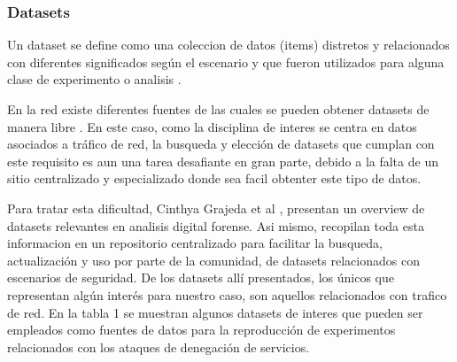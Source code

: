 \documentclass[12pt]{article}
\begin{document}

\subsubsection{Datasets} 

Un dataset se define como una coleccion de datos (items) distretos y
relacionados con diferentes significados según el escenario y que
fueron utilizados para alguna clase de experimento o analisis
\citep{datasets_availability}.

En la red existe diferentes fuentes de las cuales se pueden obtener
datasets de manera libre \citep{UCI, kaggle,
  awesome_public_datasets}. En este caso, como la disciplina de
interes se centra en datos asociados a tráfico de red, la busqueda y
elección de datasets que cumplan con este requisito es aun una tarea
desafiante en gran parte, debido a la falta de un sitio centralizado y
especializado donde sea facil obtenter este tipo de datos.

Para tratar esta dificultad, Cinthya Grajeda et al
\citep{datasets_availability}, presentan un overview de datasets
relevantes en analisis digital forense. Asi mismo, recopilan toda esta
informacion en un repositorio centralizado \citep{ds_cyber_forensics}
para facilitar la busqueda, actualización y uso por parte de la
comunidad, de datasets relacionados con escenarios de seguridad. De
los datasets allí presentados, los únicos que representan algún
interés para nuestro caso, son aquellos relacionados con trafico de
red. En la tabla 1 se muestran algunos datasets de interes que pueden
ser empleados como fuentes de datos para la reproducción de
experimentos relacionados con los ataques de denegación de servicios.
\end{document}
